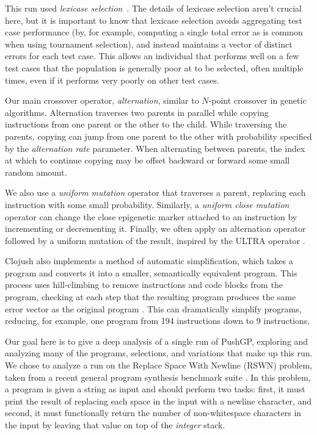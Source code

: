\documentclass[graybox]{svmult}
\begin{document}
This run used \emph{lexicase 
	selection}~\cite{Spector:2012:GECCOcompA,Helmuth:2015:GECCO,Helmuth:2016:GECCO}. The details of lexicase selection
aren't crucial here, but it is important to know that lexicase selection
avoids aggregating test case performance (by, for example, computing a single
total error as is common when using tournament selection), and instead maintains
a vector of distinct errors for each test case. This allows an individual that 
performs well on a few test cases that the population is generally poor at to 
be selected, often multiple times, even if it performs very poorly on other 
test cases.

Our main crossover operator, \emph{alternation}, similar to $N$-point crossover in genetic algorithms.
Alternation traverses two parents in parallel while copying instructions from one parent or 
the other to the child. While traversing the parents, copying can jump from one parent to the other with probability specified by the \emph{alternation rate} parameter. When alternating between parents, the index at which to continue copying may be offset backward or forward some small random amount.

We also use a \emph{uniform mutation} operator that traverses a parent, 
replacing each instruction with some small probability. Similarly, a 
\emph{uniform close mutation} operator can change the close epigenetic marker 
attached to an instruction by incrementing or decrementing it. Finally, we 
often apply an alternation operator followed by a uniform mutation of the 
result, inspired by the ULTRA operator \cite{Spector:2013:GPTP}.

Clojush also implements a method of automatic simplification, which takes a program and 
converts it into a smaller, semantically equivalent program. This process uses 
hill-climbing to remove instructions and code blocks from the program, checking 
at each step that the resulting program produces the same error vector as the 
original program \cite{Spector:2014:GECCOcomp}. This can dramatically simplify programs, reducing, for example, one program from 194 instructions down to 9 instructions.

Our goal here is to give a deep analysis of a single run of PushGP, exploring and analyzing many of the programs, selections, and variations that make up this run. We chose to analyze a run on the Replace Space With Newline (RSWN) problem, taken from a recent general program synthesis benchmark suite \cite{Helmuth:2015:GECCO}. In this problem, a program is given a string as input and should perform two tasks: first, it must print the result of replacing each space in the input with a newline character, and second, it must functionally return the number of non-whitespace characters in the input by leaving that value on top of the \emph{integer} stack. 
\end{document}
